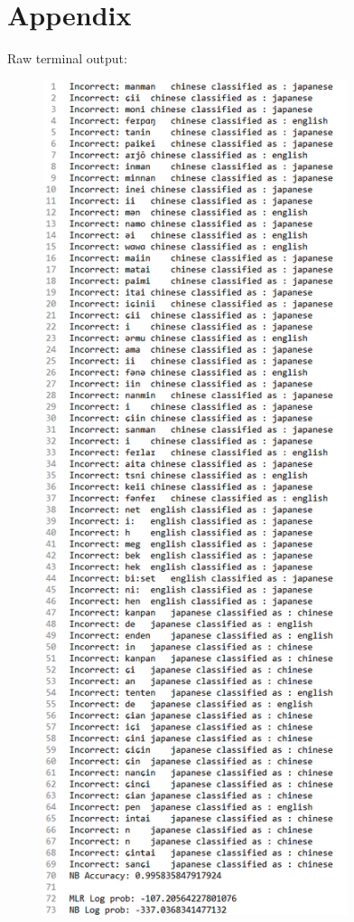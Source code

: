 \documentclass[a4paper]{article}
\begin{document}
\section{Appendix}
Raw terminal output: 
\begin{figure}[H]
\centering
\includegraphics[width=3.5in]{nbresult.png}
\end{figure}
\end{document}
